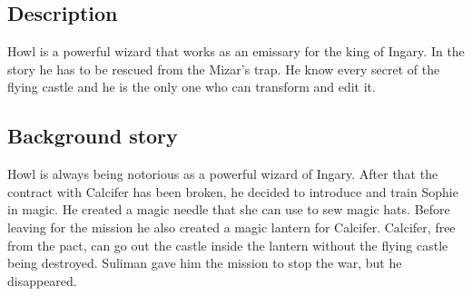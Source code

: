 \subsection{Description}
Howl is a powerful wizard that works as an emissary for the king of Ingary. In the story he has to be rescued from the Mizar’s trap. He know every secret of the flying castle and he is the only one who can transform and edit it.

\subsection{Background story}
Howl is always being notorious as a powerful wizard of Ingary. After that the contract with Calcifer has been broken, he decided to introduce and train Sophie in magic. He created a magic needle that she can use to sew magic hats. Before leaving for the mission he also created a magic lantern for Calcifer. Calcifer, free from the pact, can go out the castle inside the lantern without the flying castle being destroyed. Suliman gave him the mission to stop the war, but he disappeared.
